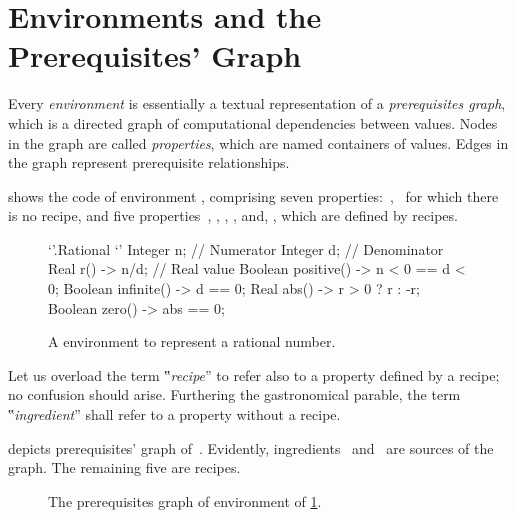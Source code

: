 \section{Environments and the Prerequisites' Graph}

Every \emph{environment} is essentially a textual representation of a
\emph{prerequisites graph}, which is a directed graph of computational
dependencies between values. Nodes in the graph are called \emph{properties},
which are named containers of values. Edges in the graph represent prerequisite
relationships.

 shows the \Reap code of environment ,
comprising seven properties:~,~ for which there is no recipe, and
five properties~, , , , and, ,
which are defined by recipes.

\begin{figure}\caption{\label{figure:rational}%
      A \Reap environment to represent a rational number.
    }
    \begin{adjustbox}{max width=\columnwidth}
\begin{reap}
`'.Rational {`'
  Integer n; // Numerator
  Integer d; // Denominator
  Real r() -> n/d; // Real value
  Boolean positive() -> n < 0 == d < 0;
  Boolean infinite() -> d == 0;
  Real abs() -> r > 0 ? r : -r;
  Boolean zero() -> abs == 0;
}
\end{reap}
\end{adjustbox}
\end{figure}

Let us overload the term ‟\emph{recipe}” to refer also to a property defined by a
recipe; no confusion should arise. Furthering the gastronomical parable, the
term ‟\emph{ingredient}” shall refer to a property without a recipe.

 depicts prerequisites' graph
of~. Evidently, ingredients~ and~ are sources of the
graph. The remaining five are recipes.

\begin{figure}
  \caption{\label{figure:rational:prerequisites}%
    The prerequisites graph of \Reap environment  of
    \cref{figure:rational}.
  }
  \begin{adjustbox}{max width=\columnwidth}
      
  \end{adjustbox}
\end{figure}

